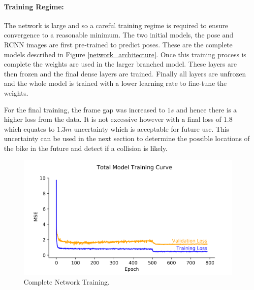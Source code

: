 \documentclass[11pt,twoside]{report}
\begin{document}
\paragraph{Training Regime:}The network is large and so a careful training regime is required to ensure convergence to a reasonable minimum. The two initial models, the pose and RCNN images are first pre-trained to predict poses. These are the complete models described in Figure \ref{network_architecture}. Once this training process is complete the weights are used in the larger branched model. These layers are then frozen and the final dense layers are trained. Finally all layers are unfrozen and the whole model is trained with a lower learning rate to fine-tune the weights.


For the final training, the frame gap was increased to $1s$ and hence there is a higher loss from the data. It is not excessive however with  a final loss of $1.8$ which equates to $1.3m$ uncertainty which is acceptable for future use. This uncertainty can be used in the next section to determine the possible locations of the bike in the future and detect if a collision is likely.


\noindent \begin{figure}[h!]
	\includegraphics[width = 1.0\hsize]{figures/total_model_training.png}
	\caption{Complete Network Training.}
	\label{total_training_curve}
\end{figure}
\end{document}
